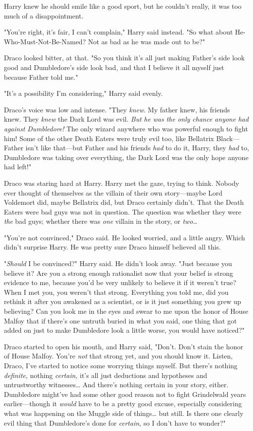 Harry knew he should smile like a good sport, but he couldn't really, it was 
too much of a disappointment.

"You're right, it's fair, I can't complain," Harry said instead. "So what about 
He-Who-Must-Not-Be-Named? Not as bad as he was made out to be?"

Draco looked bitter, at that. "So you think it's all just making Father's side 
look good and Dumbledore's side look bad, and that I believe it all myself just 
because Father told me."

"It's a possibility I'm considering," Harry said evenly.

Draco's voice was low and intense. "They \emph{knew}. My father knew, his 
friends knew. They \emph{knew} the Dark Lord was evil. \emph{But he was the 
only chance anyone had against Dumbledore!} The only wizard anywhere who was 
powerful enough to fight him! Some of the other Death Eaters were truly evil 
too, like Bellatrix Black---Father isn't like that---but Father and his friends 
\emph{had} to do it, Harry, they \emph{had} to, Dumbledore was taking over 
everything, the Dark Lord was the only hope anyone had left!"

Draco was staring hard at Harry. Harry met the gaze, trying to think. Nobody 
ever thought of themselves as the villain of their own story---maybe Lord 
Voldemort did, maybe Bellatrix did, but Draco certainly didn't. That the Death 
Eaters were bad guys was not in question. The question was whether they were 
\emph{the} bad guys; whether there was \emph{one} villain in the story, or 
\emph{two{\ldots}}

"You're not convinced," Draco said. He looked worried, and a little angry. 
Which didn't surprise Harry. He was pretty sure Draco himself believed all this.

"\emph{Should} I be convinced?" Harry said. He didn't look away. "Just because 
you believe it? Are you a strong enough rationalist now that your belief is 
strong evidence to me, because you'd be very unlikely to believe it if it 
weren't true? When I met you, you weren't that strong. Everything you told me, 
did you rethink it after you awakened as a scientist, or is it just something 
you grew up believing? Can you look me in the eyes and swear to me upon the 
honor of House Malfoy that if there's one untruth buried in what you said, one 
thing that got added on just to make Dumbledore look a little worse, you would 
have noticed?"

Draco started to open his mouth, and Harry said, "Don't. Don't stain the honor 
of House Malfoy. You're \emph{not} that strong yet, and you should know it. 
Listen, Draco, I've started to notice some worrying things myself. But there's 
nothing \emph{definite,} nothing \emph{certain,} it's all just deductions and 
hypotheses and untrustworthy witnesses{\ldots} And there's nothing certain in 
your story, either. Dumbledore might've had some other good reason not to fight 
Grindelwald years earlier---though it \emph{would} have to be a pretty good 
excuse, especially considering what was happening on the Muggle side of 
things{\ldots} but still. Is there one clearly evil thing that Dumbledore's 
done for \emph{certain,} so I don't have to wonder?"


